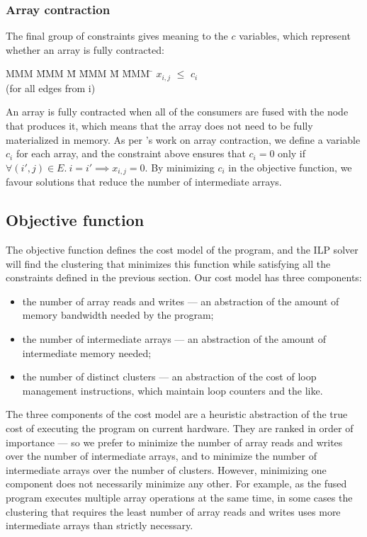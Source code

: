 \subsubsection{Array contraction}
The final group of constraints gives meaning to the $c$ variables, which represent whether an array is fully contracted:
\begin{tabbing}
MMM     \= MMM \= M \= MMM \= M \= MMM \= \kill
        \> $x_{i,j}$    \> $\le$ \> $c_i$  \> \> \\
        \> (for all edges from i)
\end{tabbing}

An array is fully contracted when all of the consumers are fused with the node that produces it, which means that the array does not need to be fully materialized in memory.
As per \citet{darte2002contraction}'s work on array contraction, we define a variable $c_i$ for each array, and the constraint above ensures that $c_i = 0$ only if $\forall (i',j) \in E.\ i = i' \implies x_{i,j} = 0$.
By minimizing $c_i$ in the objective function, we favour solutions that reduce the number of intermediate arrays.


\subsection{Objective function}
\label{clustering:s:ObjectiveFunction}
The objective function defines the cost model of the program, and the ILP solver will find the clustering that minimizes this function while satisfying all the constraints defined in the previous section.
Our cost model has three components:
\begin{itemize}
\item
the number of array reads and writes --- an abstraction of the amount of memory bandwidth needed by the program; 
\item
the number of intermediate arrays --- an abstraction of the amount of intermediate memory needed; 
\item
the number of distinct clusters --- an abstraction of the cost of loop management instructions, which maintain loop counters and the like.
\end{itemize}

The three components of the cost model are a heuristic abstraction of the true cost of executing the program on current hardware.
They are ranked in order of importance --- so we prefer to minimize the number of array reads and writes over the number of intermediate arrays, and to minimize the number of intermediate arrays over the number of clusters.
However, minimizing one component does not necessarily minimize any other.
For example, as the fused program executes multiple array operations at the same time, in some cases the clustering that requires the least number of array reads and writes uses more intermediate arrays than strictly necessary.

